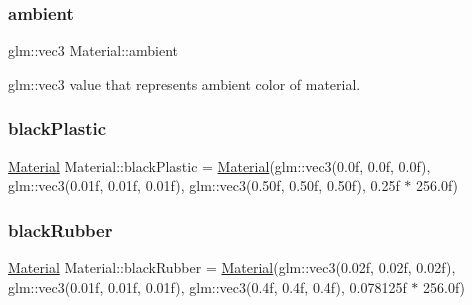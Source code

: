 \mbox{\label{struct_material_af99c823542e497c98a35d1aac5fc9012}} 
\subsubsection{\texorpdfstring{ambient}{ambient}}
{\footnotesize\ttfamily glm\+::vec3 Material\+::ambient}



glm\+::vec3 value that represents ambient color of material. 

\mbox{\label{struct_material_a7d31f06894812f15ccca287f46703b99}} 
\subsubsection{\texorpdfstring{blackPlastic}{blackPlastic}}
{\footnotesize\ttfamily \mbox{\hyperlink{struct_material}{Material}} Material\+::black\+Plastic = \mbox{\hyperlink{struct_material}{Material}}(glm\+::vec3(0.\+0f, 0.\+0f, 0.\+0f), glm\+::vec3(0.\+01f, 0.\+01f, 0.\+01f), glm\+::vec3(0.\+50f, 0.\+50f, 0.\+50f), 0.\+25f $\ast$ 256.\+0f)\hspace{0.3cm}{\ttfamily [static]}}

\mbox{\label{struct_material_a0772c33ab6f82b876232153661a64c76}} 
\subsubsection{\texorpdfstring{blackRubber}{blackRubber}}
{\footnotesize\ttfamily \mbox{\hyperlink{struct_material}{Material}} Material\+::black\+Rubber = \mbox{\hyperlink{struct_material}{Material}}(glm\+::vec3(0.\+02f, 0.\+02f, 0.\+02f), glm\+::vec3(0.\+01f, 0.\+01f, 0.\+01f), glm\+::vec3(0.\+4f, 0.\+4f, 0.\+4f), 0.\+078125f $\ast$ 256.\+0f)\hspace{0.3cm}{\ttfamily [static]}}

\mbox{\label{struct_material_a9db90c13365c8487d52c24bb2ab1882b}} 
